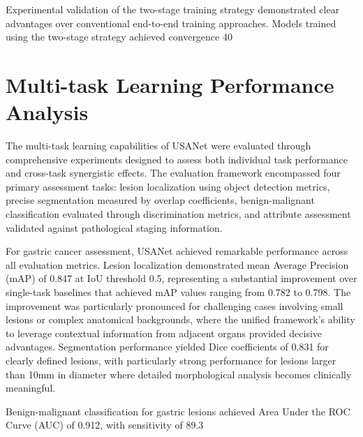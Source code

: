 Experimental validation of the two-stage training strategy demonstrated clear advantages over conventional end-to-end training approaches. Models trained using the two-stage strategy achieved convergence 40%

\section{Multi-task Learning Performance Analysis}

The multi-task learning capabilities of USANet were evaluated through comprehensive experiments designed to assess both individual task performance and cross-task synergistic effects. The evaluation framework encompassed four primary assessment tasks: lesion localization using object detection metrics, precise segmentation measured by overlap coefficients, benign-malignant classification evaluated through discrimination metrics, and attribute assessment validated against pathological staging information.

For gastric cancer assessment, USANet achieved remarkable performance across all evaluation metrics. Lesion localization demonstrated mean Average Precision (mAP) of 0.847 at IoU threshold 0.5, representing a substantial improvement over single-task baselines that achieved mAP values ranging from 0.782 to 0.798. The improvement was particularly pronounced for challenging cases involving small lesions or complex anatomical backgrounds, where the unified framework's ability to leverage contextual information from adjacent organs provided decisive advantages. Segmentation performance yielded Dice coefficients of 0.831 for clearly defined lesions, with particularly strong performance for lesions larger than 10mm in diameter where detailed morphological analysis becomes clinically meaningful.

Benign-malignant classification for gastric lesions achieved Area Under the ROC Curve (AUC) of 0.912, with sensitivity of 89.3%

